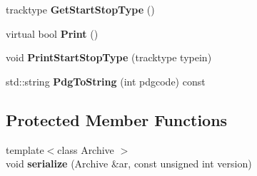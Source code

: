 \begin{DoxyCompactItemize}
\item 
\hypertarget{classParticle_ab404296b0aade0d142ed84346f1f28fe}{tracktype {\bfseries Get\-Start\-Stop\-Type} ()}\label{classParticle_ab404296b0aade0d142ed84346f1f28fe}

\item 
\hypertarget{classParticle_ae7b8186de6a1411be76fb81f7e175a2b}{virtual bool {\bfseries Print} ()}\label{classParticle_ae7b8186de6a1411be76fb81f7e175a2b}

\item 
\hypertarget{classParticle_a682e48911a77706d2257a8bd8bb5b024}{void {\bfseries Print\-Start\-Stop\-Type} (tracktype typein)}\label{classParticle_a682e48911a77706d2257a8bd8bb5b024}

\item 
\hypertarget{classParticle_a702bafa2b8781400e32ffec62fe9831b}{std\-::string {\bfseries Pdg\-To\-String} (int pdgcode) const }\label{classParticle_a702bafa2b8781400e32ffec62fe9831b}

\end{DoxyCompactItemize}
\subsection*{Protected Member Functions}
\begin{DoxyCompactItemize}
\item 
\hypertarget{classParticle_a1eb7cb8c7b7187340fc826a86e4788c9}{{\footnotesize template$<$class Archive $>$ }\\void {\bfseries serialize} (Archive \&ar, const unsigned int version)}\label{classParticle_a1eb7cb8c7b7187340fc826a86e4788c9}

\end{DoxyCompactItemize}
